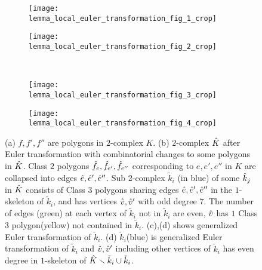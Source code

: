 \begin{figure}[htp!] 
  \begin{subfigure}[t]{2.5in}
    \centering
    \texttt{[image: lemma\_local\_euler\_transformation\_fig\_1\_crop]}
    \caption{\label{fig:lemmalocaleulertransformationa}}
  \end{subfigure}
  \hspace*{0.8in}
  \begin{subfigure}[t]{2.5in}
    \centering
    \texttt{[image: lemma\_local\_euler\_transformation\_fig\_2\_crop]}
    \caption{\label{fig:lemmalocaleulertransformationb}}
  \end{subfigure}
  \vspace*{0.3in}\\	
  \begin{subfigure}[t]{2.5in}
    \centering
    \texttt{[image: lemma\_local\_euler\_transformation\_fig\_3\_crop]}
    \caption{\label{fig:lemmalocaleulertransformationc}}
  \end{subfigure}
  \hspace*{0.8in}		
  \begin{subfigure}[t]{2.5in}
    \centering
    \texttt{[image: lemma\_local\_euler\_transformation\_fig\_4\_crop]}
    \caption{\label{fig:lemmalocaleulertransformationd}}
  \end{subfigure}
  \caption{  \label{fig:lemmalocaleulertransformation}
    (a) $f, f', f''$ are polygons in $2$-complex $K$.
    (b) $2$-complex $\hat{K}$ after Euler transformation with combinatorial changes to some polygons in $\hat{K}$. Class $2$ polygons $\hat{f}_e,\hat{f}_{e'}, \hat{f}_{e''}$ corresponding to $e, e', e''$ in $K$ are collapsed into edges $\hat{e}, \hat{e}', \hat{e}''$.
    Sub $2$-complex $\tilde{k}_i$ (in blue) of some $\hat{k}_j$ in $\hat{K}$ consists of Class $3$ polygons sharing edges $\hat{e}, \hat{e}', \hat{e}''$ in the $1$-skeleton of $\tilde{k}_i$, and has vertices $\hat{v}, \hat{v}'$ with odd degree $7$.
    The number of edges (green) at each vertex of $\tilde{k}_i$ not in $\tilde{k}_i$ are even, $\hat{v}$ has $1$ Class $3$ polygon(yellow) not contained in $\tilde{k}_i$. (c),(d) shows generalized Euler transformation of $\tilde{k}_i$. (d) $\check{k}_i$(blue) is generalized Euler transformation of $\tilde{k}_i$ and $\hat{v}, \hat{v}'$ including other vertices of $\check{k}_i$ has even degree in $1$-skeleton of $\hat{K} \smallsetminus \tilde{k}_i \cup \check{k}_i$.
  }
\end{figure}

